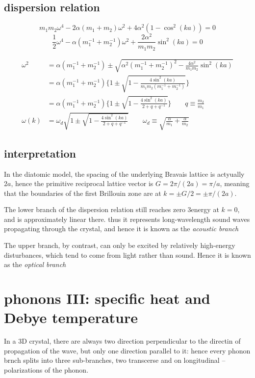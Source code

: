 \documentclass[10pt, a4paper, twocolumn]{article}
\begin{document}
\subsection{dispersion relation}
\[m_1m_2\omega ^4-2\alpha (m_1+m_2)\omega ^2
+4\alpha ^2(1-\cos ^2(ka))=0\]
\[\frac12\omega ^4-\alpha (m_1^{-1}+m_2^{-1})
\omega ^2
+\frac{2\alpha ^2}{m_1m_2}\sin ^2(ka)=0\]

\begin{equation*}
\begin{aligned}
\omega ^2&=\alpha (m_1^{-1}+m_2^{-1})
\pm
\sqrt{\alpha ^2(m_1^{-1}+m_2^{-1})^2
-\frac{4\alpha ^2}{m_1m_2}\sin ^2(ka)}
\\&=\alpha (m_1^{-1}+m_2^{-1})
\Bigg\{1 \pm \sqrt{1-
\frac{4\sin ^2(ka)}{m_1m_2(m_1^{-1}+m_2^{-1})}}
\Bigg\}
\\&=\alpha (m_1^{-1}+m_2^{-1})
\Bigg\{1 \pm \sqrt{1- \frac{4\sin ^2(ka)}{2+q+q^{-1}}}
\Bigg\}\qquad q\equiv\frac{m_2}{m_1}
\\\omega (k)&= \omega _d
\sqrt{1\pm
\sqrt{1-\frac{4\sin ^2(ka)}{2+q+q^{-1}}}}
\qquad \omega _d\equiv
\sqrt{\frac{\alpha}{m_1}+\frac{\alpha}{m_2}}
\end{aligned}
\end{equation*}

\subsection{interpretation}
In the diatomic model, the spacing of the underlying Bravais lattice is actyually $2a$, hence the primitive reciprocal lattice vector is $G=2\pi/(2a) = \pi /a$, meaning that the boundaries of the first Brillouin zone are at $k=\pm G/2 = \pm \pi/(2a)$.

The lower branch of the dispersion relation still reaches zero 3energy at $k=0$, and is approximately linear there. thus it represents long-wavelength sound waves propagating through the crystal, and hence it is known as the \emph{acoustic branch}

The upper branch, by contrast, can only be excited by relatively high-energy disturbances, which tend to come from light rather than sound. Hence it is known as the \emph{optical branch}

\section{phonons III: specific heat and Debye temperature}

In a 3D crystal, there are always two direction perpendicular to the directin of propagation of the wave, but only one direction parallel to it: hence every phonon brnch splits into three sub-branches, two transcerse and on longitudinal -- polarizations of the phonon.
\end{document}
